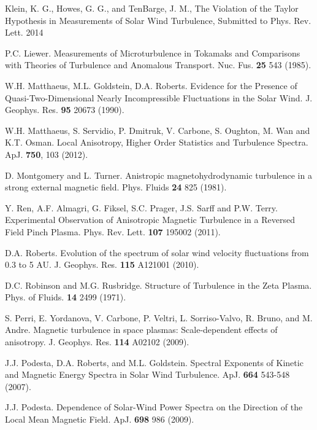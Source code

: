 \documentclass[manuscript]{aastex}
\begin{document}
\begin{thebibliography}{}
 Klein, K. G., Howes, G. G., and TenBarge, J. M., The Violation of the Taylor Hypothesis in Measurements of Solar Wind Turbulence, Submitted to Phys. Rev. Lett. 2014

 P.C. Liewer. Measurements of Microturbulence in Tokamaks and Comparisons with Theories of Turbulence and Anomalous Transport. Nuc. Fus. {\bf 25} 543 (1985).

 W.H. Matthaeus, M.L. Goldstein, D.A. Roberts. Evidence for the Presence of Quasi-Two-Dimensional Nearly Incompressible Fluctuations in the Solar Wind. J. Geophys. Res. {\bf 95} 20673 (1990).

W.H. Matthaeus, S. Servidio, P. Dmitruk, V. Carbone, S. Oughton, M. Wan and K.T. Osman. Local Anisotropy, Higher Order Statistics and Turbulence Spectra. ApJ. {\bf 750}, 103 (2012).

 D. Montgomery and L. Turner. Anistropic magnetohydrodynamic turbulence in a strong external magnetic field. Phys. Fluids {\bf 24} 825 (1981).

 Y. Ren, A.F. Almagri, G. Fiksel, S.C. Prager, J.S. Sarff and P.W. Terry. Experimental Observation of Anisotropic Magnetic Turbulence in a Reversed Field Pinch Plasma. Phys. Rev. Lett. {\bf 107} 195002 (2011).

 D.A. Roberts. Evolution of the spectrum of solar wind velocity fluctuations from 0.3 to 5 AU. J. Geophys. Res. {\bf 115} A121001 (2010).

 D.C. Robinson and M.G. Rusbridge. Structure of Turbulence in the Zeta Plasma. Phys. of Fluids. {\bf 14} 2499 (1971).

 S. Perri, E. Yordanova, V. Carbone, P. Veltri, L. Sorriso-Valvo, R. Bruno, and M. Andre. Magnetic turbulence in space plasmas: Scale-dependent effects of anisotropy. J. Geophys. Res. {\bf 114} A02102 (2009).

 J.J. Podesta, D.A. Roberts, and M.L. Goldstein. Spectral Exponents of Kinetic and Magnetic Energy Spectra in Solar Wind Turbulence. ApJ. {\bf 664} 543-548 (2007).

 J.J. Podesta. Dependence of Solar-Wind Power Spectra on the Direction of the Local Mean Magnetic Field. ApJ. {\bf 698} 986 (2009).


\end{thebibliography}
\end{document}
